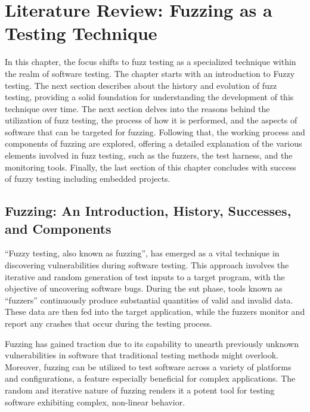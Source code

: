 \vspace{21.5pt}
\chapter{Literature Review: Fuzzing as a Testing Technique}\label{sec:sec_fuzzing}
In this chapter, the focus shifts to fuzz testing as a specialized technique within the realm of
software testing. The chapter starts with an introduction to Fuzzy testing.  The next section describes
about the history and evolution of fuzz testing, providing a solid foundation for understanding the
development of this technique over time. The next section delves into the reasons behind the
utilization of fuzz testing, the process of how it is performed, and the aspects of software
that can be targeted for fuzzing. Following that, the working process and components of
fuzzing are explored, offering a detailed explanation of the various elements involved in fuzz testing,
such as the \gls{fuzzers}, the test harness, and the monitoring tools. Finally, the last section of this chapter
concludes with success of fuzzy testing including embedded projects.

\section{Fuzzing: An Introduction, History, Successes, and Components}
``Fuzzy testing, also known as fuzzing'', has emerged as a vital technique in
discovering vulnerabilities during software testing. This approach involves the iterative and
random generation of test inputs to a target program, with the objective of uncovering software bugs.
During the \gls{sut} phase, tools known as ``fuzzers'' continuously produce substantial quantities
of valid and invalid data. These data are then fed into the target application, while the
\gls{fuzzers} monitor and report any crashes that occur during the testing process\cite{klees2018evaluating}\cite{li2018fuzzing}.

Fuzzing has gained traction due to its capability to unearth previously unknown vulnerabilities
in software that traditional testing methods might overlook. Moreover, fuzzing can be utilized
to test software across a variety of platforms and configurations, a feature especially beneficial
for complex applications. The random and iterative nature of fuzzing renders it a potent tool for
testing software exhibiting complex, non-linear behavior\cite{klees2018evaluating}.

